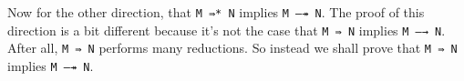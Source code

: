 Now for the other direction, that \texttt{M\ ⇛*\ N} implies
\texttt{M\ —↠\ N}. The proof of this direction is a bit different
because it's not the case that \texttt{M\ ⇛\ N} implies
\texttt{M\ —→\ N}. After all, \texttt{M\ ⇛\ N} performs many reductions.
So instead we shall prove that \texttt{M\ ⇛\ N} implies
\texttt{M\ —↠\ N}.

\begin{fence}
\begin{code}%
\>[0]\AgdaSpace{}%
\AgdaSymbol{:}\AgdaSpace{}%
\AgdaSpace{}%
\AgdaSymbol{\}\{}\AgdaSpace{}%
\AgdaSpace{}%
\AgdaSymbol{:}\AgdaSpace{}%
\AgdaSpace{}%
\AgdaSpace{}%
\AgdaSymbol{\}}\<%
\\
\>[0][@{}l@{\AgdaIndent{0}}]%
\>[2]%
\>[355I]\AgdaSpace{}%
\AgdaSpace{}%
\<%
\\
\>[.][@{}l@{}]\<[355I]%
\>[4]\AgdaComment{------}\<%
\\
%
\>[2]\AgdaSpace{}%
\AgdaSpace{}%
\AgdaSpace{}%
\<%
\\
\>[0]\AgdaSpace{}%
\AgdaSymbol{\{}\AgdaSymbol{\}}\AgdaSpace{}%
\AgdaSymbol{\{}\AgdaSymbol{\}}\AgdaSpace{}%
\AgdaSymbol{\{}\AgdaSpace{}%
\AgdaDottedPattern{\AgdaSymbol{\AgdaUnderscore{})}}\AgdaSymbol{\}}\AgdaSpace{}%
\AgdaSymbol{(}\AgdaSymbol{\{}\AgdaSpace{}%
\AgdaSymbol{=}\AgdaSpace{}%
\AgdaSymbol{\})}\AgdaSpace{}%
\AgdaSymbol{=}\AgdaSpace{}%
\AgdaSymbol{(}\AgdaSpace{}%
\AgdaSymbol{)}\AgdaSpace{}%
\<%
\\
\>[0]\AgdaSpace{}%
\AgdaSymbol{\{}\AgdaSymbol{\}}\AgdaSpace{}%
\AgdaSymbol{\{}\AgdaSymbol{\}}\AgdaSpace{}%
\AgdaSymbol{\{}\AgdaSpace{}%
\AgdaSymbol{\}}\AgdaSpace{}%
\AgdaSymbol{(}\AgdaSpace{}%
\AgdaSymbol{)}\AgdaSpace{}%
\AgdaSymbol{=}\AgdaSpace{}%
\AgdaSpace{}%
\AgdaSymbol{(}\AgdaSpace{}%
\AgdaSymbol{)}\<%
\\

\end{code}
\end{fence}
